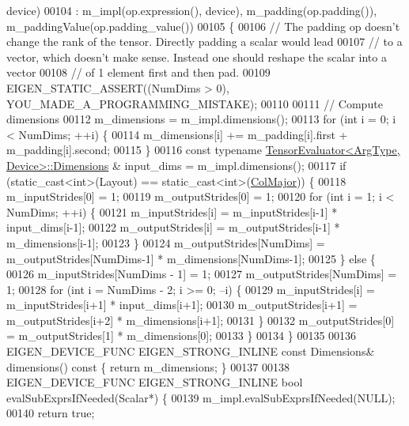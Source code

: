 \begin{DoxyCode}
      device)
00104       : m\_impl(op.expression(), device), m\_padding(op.padding()), m\_paddingValue(op.padding\_value())
00105   \{
00106     \textcolor{comment}{// The padding op doesn't change the rank of the tensor. Directly padding a scalar would lead}
00107     \textcolor{comment}{// to a vector, which doesn't make sense. Instead one should reshape the scalar into a vector}
00108     \textcolor{comment}{// of 1 element first and then pad.}
00109     EIGEN\_STATIC\_ASSERT((NumDims > 0), YOU\_MADE\_A\_PROGRAMMING\_MISTAKE);
00110 
00111     \textcolor{comment}{// Compute dimensions}
00112     m\_dimensions = m\_impl.dimensions();
00113     \textcolor{keywordflow}{for} (\textcolor{keywordtype}{int} i = 0; i < NumDims; ++i) \{
00114       m\_dimensions[i] += m\_padding[i].first + m\_padding[i].second;
00115     \}
00116     \textcolor{keyword}{const} \textcolor{keyword}{typename} \hyperlink{struct_eigen_1_1_tensor_evaluator}{TensorEvaluator<ArgType, Device>::Dimensions}
      & input\_dims = m\_impl.dimensions();
00117     \textcolor{keywordflow}{if} (static\_cast<int>(Layout) == static\_cast<int>(\hyperlink{group__enums_ggaacded1a18ae58b0f554751f6cdf9eb13a0cbd4bdd0abcfc0224c5fcb5e4f6669a}{ColMajor})) \{
00118       m\_inputStrides[0] = 1;
00119       m\_outputStrides[0] = 1;
00120       \textcolor{keywordflow}{for} (\textcolor{keywordtype}{int} i = 1; i < NumDims; ++i) \{
00121         m\_inputStrides[i] = m\_inputStrides[i-1] * input\_dims[i-1];
00122         m\_outputStrides[i] = m\_outputStrides[i-1] * m\_dimensions[i-1];
00123       \}
00124       m\_outputStrides[NumDims] = m\_outputStrides[NumDims-1] * m\_dimensions[NumDims-1];
00125     \} \textcolor{keywordflow}{else} \{
00126       m\_inputStrides[NumDims - 1] = 1;
00127       m\_outputStrides[NumDims] = 1;
00128       \textcolor{keywordflow}{for} (\textcolor{keywordtype}{int} i = NumDims - 2; i >= 0; --i) \{
00129         m\_inputStrides[i] = m\_inputStrides[i+1] * input\_dims[i+1];
00130         m\_outputStrides[i+1] = m\_outputStrides[i+2] * m\_dimensions[i+1];
00131       \}
00132       m\_outputStrides[0] = m\_outputStrides[1] * m\_dimensions[0];
00133     \}
00134   \}
00135 
00136   EIGEN\_DEVICE\_FUNC EIGEN\_STRONG\_INLINE \textcolor{keyword}{const} Dimensions& dimensions()\textcolor{keyword}{ const }\{ \textcolor{keywordflow}{return} m\_dimensions; \}
00137 
00138   EIGEN\_DEVICE\_FUNC EIGEN\_STRONG\_INLINE \textcolor{keywordtype}{bool} evalSubExprsIfNeeded(Scalar*) \{
00139     m\_impl.evalSubExprsIfNeeded(NULL);
00140     \textcolor{keywordflow}{return} \textcolor{keyword}{true};

\end{DoxyCode}
